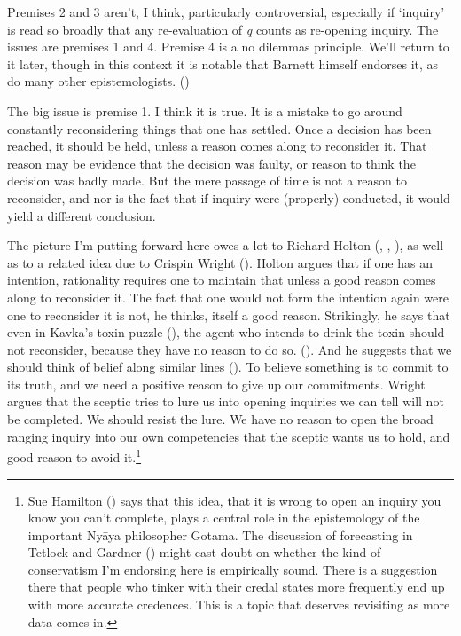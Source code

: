 \documentclass[
  10pt,
  letterpaper,
  DIV=11,
  numbers=noendperiod,
  twoside]{scrartcl}
\begin{document}
Premises 2 and 3 aren't, I think, particularly controversial, especially
if `inquiry' is read so broadly that any re-evaluation of \emph{q}
counts as re-opening inquiry. The issues are premises 1 and 4. Premise 4
is a no dilemmas principle. We'll return to it later, though in this
context it is notable that Barnett himself endorses it, as do many other
epistemologists. ()

The big issue is premise 1. I think it is true. It is a mistake to go
around constantly reconsidering things that one has settled. Once a
decision has been reached, it should be held, unless a reason comes
along to reconsider it. That reason may be evidence that the decision
was faulty, or reason to think the decision was badly made. But the mere
passage of time is not a reason to reconsider, and nor is the fact that
if inquiry were (properly) conducted, it would yield a different
conclusion.

The picture I'm putting forward here owes a lot to Richard Holton
(, ,
), as well as to a related idea due to
Crispin Wright (). Holton argues that if
one has an intention, rationality requires one to maintain that unless a
good reason comes along to reconsider it. The fact that one would not
form the intention again were one to reconsider it is not, he thinks,
itself a good reason. Strikingly, he says that even in Kavka's toxin
puzzle (), the agent who intends to
drink the toxin should not reconsider, because they have no reason to do
so. (). And he suggests
that we should think of belief along similar lines
(). To believe something is to
commit to its truth, and we need a positive reason to give up our
commitments. Wright argues that the sceptic tries to lure us into
opening inquiries we can tell will not be completed. We should resist
the lure. We have no reason to open the broad ranging inquiry into our
own competencies that the sceptic wants us to hold, and good reason to
avoid it.\footnote{Sue Hamilton ()
  says that this idea, that it is wrong to open an inquiry you know you
  can't complete, plays a central role in the epistemology of the
  important Nyāya philosopher Gotama. The discussion of forecasting in
  Tetlock and Gardner () might cast
  doubt on whether the kind of conservatism I'm endorsing here is
  empirically sound. There is a suggestion there that people who tinker
  with their credal states more frequently end up with more accurate
  credences. This is a topic that deserves revisiting as more data comes
  in.}
\end{document}
